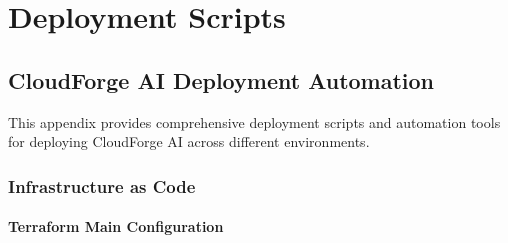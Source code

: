 \chapter{Deployment Scripts}

\section{CloudForge AI Deployment Automation}

This appendix provides comprehensive deployment scripts and automation tools for deploying CloudForge AI across different environments.

\subsection{Infrastructure as Code}

\subsubsection{Terraform Main Configuration}

